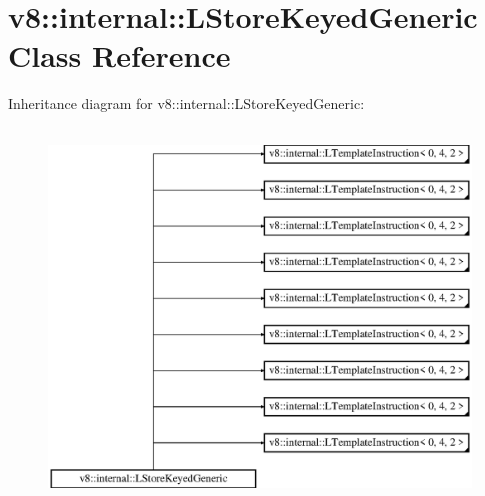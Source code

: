 \hypertarget{classv8_1_1internal_1_1_l_store_keyed_generic}{}\section{v8\+:\+:internal\+:\+:L\+Store\+Keyed\+Generic Class Reference}
\label{classv8_1_1internal_1_1_l_store_keyed_generic}
Inheritance diagram for v8\+:\+:internal\+:\+:L\+Store\+Keyed\+Generic\+:\begin{figure}[H]
\begin{center}
\leavevmode
\includegraphics[height=10.000000cm]{classv8_1_1internal_1_1_l_store_keyed_generic}
\end{center}
\end{figure}
